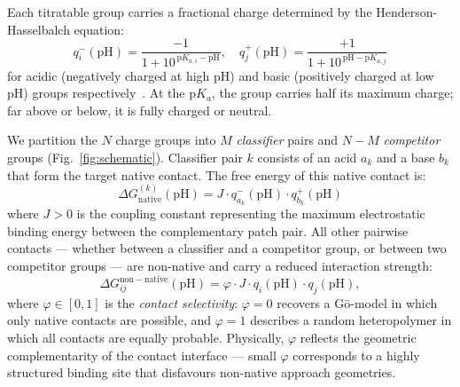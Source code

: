 \documentclass[10pt,twocolumn]{article}
\begin{document}
Each titratable group carries a fractional charge determined by the Henderson-Hasselbalch equation:
\begin{equation}
  q_i^-(\mathrm{pH}) = \frac{-1}{1 + 10^{\,\mathrm{p}K_{a,i} - \mathrm{pH}}}, \quad
  q_j^+(\mathrm{pH}) = \frac{+1}{1 + 10^{\,\mathrm{pH} - \mathrm{p}K_{a,j}}}
  \label{eq:HH}
\end{equation}
for acidic (negatively charged at high pH) and basic (positively charged at low pH) groups respectively~\cite{losdorfer2017}.
At the $\mathrm{p}K_a$, the group carries half its maximum charge; far above or below, it is fully charged or neutral.

We partition the $N$ charge groups into $M$ \emph{classifier} pairs and $N-M$ \emph{competitor} groups (Fig.~\ref{fig:schematic}).
Classifier pair $k$ consists of an acid $a_k$ and a base $b_k$ that form the target native contact.
The free energy of this native contact is:
\begin{equation}
  \Delta G_{\mathrm{native}}^{(k)}(\mathrm{pH}) = J \cdot q_{a_k}^-(\mathrm{pH})\cdot q_{b_k}^+(\mathrm{pH})
  \label{eq:dG_native}
\end{equation}
where $J > 0$ is the coupling constant representing the maximum electrostatic binding energy between the complementary patch pair.
All other pairwise contacts — whether between a classifier and a competitor group, or between two competitor groups — are non-native and carry a reduced interaction strength:
\begin{equation}
  \Delta G_{ij}^{\mathrm{non-native}}(\mathrm{pH}) = \varphi \cdot J \cdot q_i(\mathrm{pH})\cdot q_j(\mathrm{pH}),
  \label{eq:dG_nonnative}
\end{equation}
where $\varphi \in [0,1]$ is the \emph{contact selectivity}: $\varphi = 0$ recovers a G\={o}-model in which only native contacts are possible, and $\varphi = 1$ describes a random heteropolymer in which all contacts are equally probable.
Physically, $\varphi$ reflects the geometric complementarity of the contact interface — small $\varphi$ corresponds to a highly structured binding site that disfavours non-native approach geometries.
\end{document}

